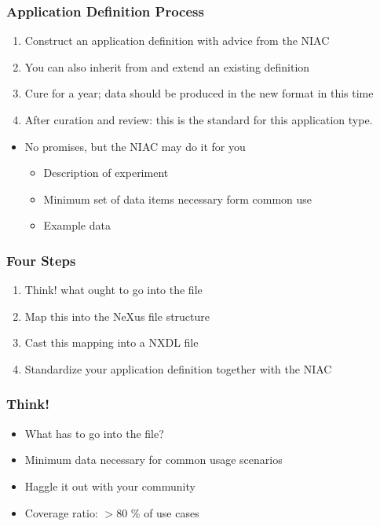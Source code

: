 \documentclass{beamer}
\begin{document}
\begin{frame} \frametitle{Application Definition Process}
\begin{enumerate}
\item Construct an application definition with advice from the NIAC
\item You can also inherit from and extend an existing definition
\item Cure for a year; data should be produced in the new format in this time
\item After curation and review: this is the standard for this application type.
\end{enumerate}
\begin{itemize}
\item No promises, but the NIAC may do it for you
\begin{itemize}
\item Description of experiment
\item Minimum set of data items necessary form common use
\item Example data
\end{itemize}
\end{itemize}

\end{frame}


\begin{frame}
\frametitle{Four Steps}
\begin{enumerate}
\item {\color{blue} Think!} what ought to go into the file
\item {\color{blue}Map }this into the NeXus file structure
\item {\color{blue} Cast} this mapping into a NXDL file
\item {\color{blue} Standardize} your application definition together with the NIAC
\end{enumerate}
\end{frame}

\begin{frame}
\frametitle{Think!}
\begin{itemize}
\item What has to go into the file?
\item Minimum data necessary for common usage scenarios
\item Haggle it out with your community
\item Coverage ratio: $> 80$ \% of use cases
\end{itemize}
\end{frame}
\end{document}
